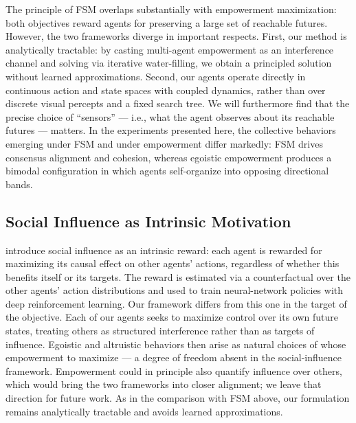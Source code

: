 \documentclass{article} %
\begin{document}
The principle of FSM overlaps substantially with empowerment
maximization: both objectives reward agents for preserving a large
set of reachable futures. However, the two frameworks diverge in
important respects. First, our method is analytically tractable: by
casting multi-agent empowerment as an interference channel and
solving via iterative water-filling, we obtain a principled solution
without learned approximations. Second, our agents operate directly
in continuous action and state spaces with coupled dynamics, rather
than over discrete visual percepts and a fixed search tree. We will
furthermore find that the precise choice of ``sensors'' --- i.e.,
what the agent observes about its reachable futures --- matters. In
the experiments presented here, the collective behaviors emerging
under FSM and under empowerment differ markedly: FSM drives
consensus alignment and cohesion, whereas egoistic empowerment
produces a bimodal configuration in which agents self-organize into
opposing directional bands.

\subsection{Social Influence as Intrinsic Motivation}

\cite{jaques2019socialinfluenceintrinsicmotivation} introduce social
influence as an intrinsic reward: each agent is rewarded for
maximizing its causal effect on other agents' actions, regardless of
whether this benefits itself or its targets. The reward is estimated
via a counterfactual over the other agents' action distributions and
used to train neural-network policies with deep reinforcement
learning. Our framework differs from this one in the target of the
objective. Each of our agents seeks to maximize control over its own
future states, treating others as structured interference rather than
as targets of influence. Egoistic and altruistic behaviors then arise
as natural choices of whose empowerment to maximize --- a degree of
freedom absent in the social-influence framework. Empowerment could
in principle also quantify influence over others, which would bring
the two frameworks into closer alignment; we leave that direction for
future work. As in the comparison with FSM above, our formulation
remains analytically tractable and avoids learned approximations.
\end{document}
